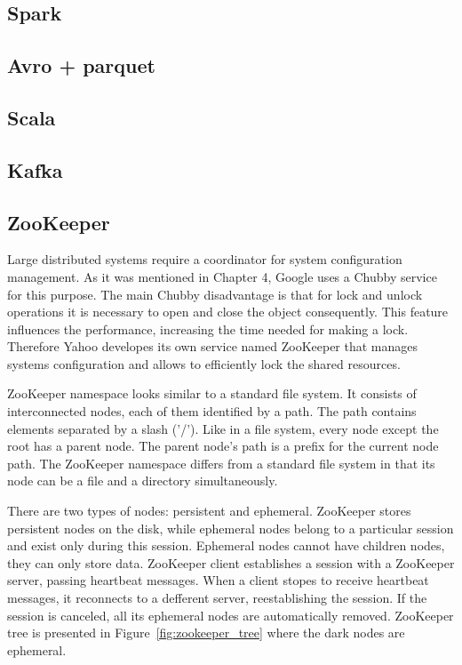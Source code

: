 \subsection{Spark}



\subsection{Avro + parquet}

\subsection{Scala}

\subsection{Kafka}

\subsection{ZooKeeper}
Large distributed systems require a coordinator for system configuration management.
As it was mentioned in Chapter 4, Google uses a Chubby service for this purpose.
The main Chubby disadvantage is that for lock and unlock operations it is necessary to open and close the object consequently.
This feature influences the performance, increasing the time needed for making a lock.
Therefore Yahoo developes its own service named ZooKeeper that manages systems configuration and allows to efficiently lock the shared resources.

ZooKeeper namespace looks similar to a standard file system.
It consists of interconnected nodes, each of them identified by a path.
The path contains elements separated by a slash ('/').
Like in a file system, every node except the root has a parent node.
The parent node's path is a prefix for the current node path.
The ZooKeeper namespace differs from a standard file system in that its node can be a file and a directory simultaneously.

There are two types of nodes: persistent and ephemeral.
ZooKeeper stores persistent nodes on the disk, while ephemeral nodes belong to a particular session and exist only during this session.
Ephemeral nodes cannot have children nodes, they can only store data.
ZooKeeper client establishes a session with a ZooKeeper server, passing heartbeat messages.
When a client stopes to receive heartbeat messages, it reconnects to a defferent server, reestablishing the session.
If the session is canceled, all its ephemeral nodes are automatically removed.
ZooKeeper tree is presented in Figure~\ref{fig:zookeeper_tree} where the dark nodes are ephemeral.

